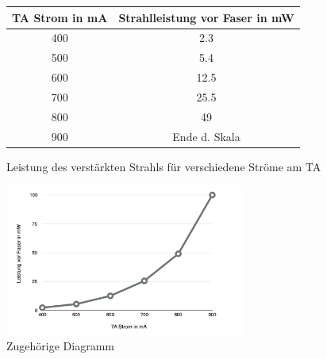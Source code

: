 \documentclass[12pt, a4paper]{article}
\begin{document}
\begin{figure}[h!]
\centering
 \begin{tabular}{|c|c|}\hline
 TA Strom in \si{\mA}&Strahlleistung vor Faser in \si{\mW}\\ \hline \hline
400&2.3\\ \hline
500&5.4\\ \hline
600&12.5\\ \hline
700&25.5\\ \hline
800&49\\ \hline
900& Ende d. Skala\\ \hline
\end{tabular}
\caption{Leistung des verstärkten Strahls für verschiedene Ströme am TA}
\label{tatab}
\end{figure}
    \begin{figure}[h!]
  \centering
  \includegraphics[width=0.7\textwidth]{TA.png}
  \caption{Zugehörige Diagramm}
  \label{TA}
  \end{figure}
\end{document}
